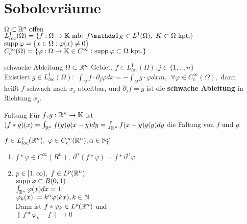 \section{Sobolevräume}

\(\Omega \subset \mathbb{R}^n \text{ offen}\)\\
\(L_{loc}^1(\Omega) = \{f:\Omega \to \KK \text{ mb: }
f\indicator_K \in L^1(\Omega),\ K\subset \Omega \text{ kpt.}\}\) \\
\(\text{supp\hspace{0.2em}}\varphi = \{x\in \Omega: \varphi(x) \neq 0\}\)\\
\(C_c^\infty(\Omega)=\{\varphi:\Omega \to \mathbb{K} \in C^\infty: 
\text{supp\hspace{0.2em}}\varphi\subset\Omega \text{ kpt.}\}\)\\

\begin{definition}{schwache Ableitung}
    \(\Omega \subset \mathbb{R}^n\) Gebiet,
    \(f\in L^1_{lov}(\Omega), j\in \{1,..,n\}\)\\
    Existiert \(g \in L^1_{loc}(\Omega):\)
    \(
        \int_\Omega f\cdot \partial_j\varphi dx =
         - \int_\Omega g\cdot \varphi dxm, \ \ 
         \forall \varphi\in C_c^{\infty}(\Omega),
    \)
    dann heißt \(f\) schwach nach \(x_j\) ableitbar, und \(\partial_jf=g\) ist
    die \textbf{schwache Ableitung} in Richtung \(x_j\).

\end{definition}

\begin{definition}{Faltung}
    Für \(f,g:\mathbb{R}^n \to \mathbb{K}\) ist
    \(
        (f\ast g )(x) = \int_{\mathbb{R}^n}f(y)g(x-y)dy
        = \int_{\mathbb{R}^n}f(x-y)g(y)dy
    \) 
    die Faltung von \(f\) und \(g\).
\end{definition}

\begin{lemma}
    \(f\in L_{loc}^1(\mathbb{R}^n),\ \varphi\in C_c^{\infty}(\mathbb{R}^n), 
    \alpha \in \mathbb{N}_0^n\)
    \begin{enumerate}[label = (\roman*)]
        \item \(f\ast \varphi \in C^\infty(R^n),\ 
            \partial^\alpha(f\ast \varphi) = f\ast \partial^\alpha\varphi\)
        \item \(p\in [1,\infty),\ f\in L^p(\mathbb{R}^n)\)\\
            \(\text{supp\hspace{0.2em}}\varphi \subset B(0,1)\)\\
            \(\int_{\mathbb{R}^n}\varphi(x)dx = 1\)\\
            \(\varphi_k(x):=k^n\varphi(kx), k\in\mathbb{N}\)\\
            Dann ist \(f\ast \varphi_k \in L^p(\mathbb{R}^n)\) und\\
            \(\|f\ast \varphi_k -f\|\to 0\)
    \end{enumerate}
\end{lemma}

